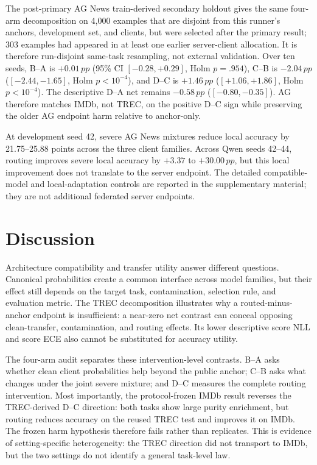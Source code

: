 \documentclass[letterpaper]{article}
\newcommand{\pp}{\,pp}
\begin{document}
The post-primary AG News train-derived secondary holdout gives the same
four-arm decomposition on 4,000 examples that are disjoint from this runner's
anchors, development set, and clients, but were selected after the primary
result; 303 examples had appeared in at least one earlier server-client
allocation.  It is therefore run-disjoint same-task resampling, not external
validation.  Over ten seeds, B--A is \(+0.01\pp\) (95\% CI
\([-0.28,+0.29]\), Holm \(p=.954\)), C--B is \(-2.04\pp\)
(\([-2.44,-1.65]\), Holm \(p<10^{-4}\)), and D--C is \(+1.46\pp\)
(\([+1.06,+1.86]\), Holm \(p<10^{-4}\)).  The descriptive D--A net remains
\(-0.58\pp\) (\([-0.80,-0.35]\)).  AG therefore matches IMDb, not TREC, on
the positive D--C sign while preserving the older AG endpoint harm relative to
anchor-only.

At development seed 42, severe AG News mixtures reduce local accuracy by
21.75--25.88 points across the three client families.  Across Qwen seeds
42--44, routing improves severe local accuracy by \(+3.37\) to
\(+30.00\pp\), but this local improvement does not translate to the server
endpoint.  The detailed compatible-model and local-adaptation controls are
reported in the supplementary material; they are not additional federated
server endpoints.

\FloatBarrier
\section{Discussion}
Architecture compatibility and transfer utility answer different questions.
Canonical probabilities create a common interface across model families, but
their effect still depends on the target task, contamination, selection rule,
and evaluation metric.  The TREC decomposition illustrates why a routed-minus-
anchor endpoint is insufficient: a near-zero net contrast can conceal opposing
clean-transfer, contamination, and routing effects.  Its lower descriptive
score NLL and score ECE also cannot be substituted for accuracy utility.

The four-arm audit separates these intervention-level contrasts.
B--A asks whether clean client probabilities help beyond the public anchor;
C--B asks what changes under the joint severe mixture; and D--C measures the
complete routing intervention.  Most importantly, the protocol-frozen IMDb
result reverses the TREC-derived D--C direction: both tasks show large purity
enrichment, but routing reduces accuracy on the reused TREC test and improves
it on IMDb.  The frozen harm hypothesis therefore fails rather than
replicates.  This is evidence of setting-specific heterogeneity: the TREC
direction did not transport to IMDb, but the two settings do not identify a
general task-level law.
\end{document}
